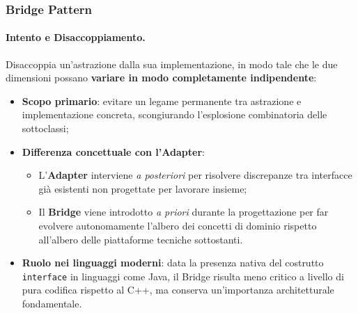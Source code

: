 \documentclass[12pt]{extarticle}
\begin{document}
\subsubsection{Bridge Pattern}

\paragraph{Intento e Disaccoppiamento.}
Disaccoppia un'astrazione dalla sua implementazione, in modo tale che le due dimensioni possano \textbf{variare in modo completamente indipendente}:
\begin{itemize}
    \item \textbf{Scopo primario}: evitare un legame permanente tra astrazione e implementazione concreta, scongiurando l'esplosione combinatoria delle sottoclassi;
    \item \textbf{Differenza concettuale con l'Adapter}:
    \begin{itemize}
        \item L'\textbf{Adapter} interviene \textit{a posteriori} per risolvere discrepanze tra interfacce già esistenti non progettate per lavorare insieme;
        \item Il \textbf{Bridge} viene introdotto \textit{a priori} durante la progettazione per far evolvere autonomamente l'albero dei concetti di dominio rispetto all'albero delle piattaforme tecniche sottostanti.
    \end{itemize}
    \item \textbf{Ruolo nei linguaggi moderni}: data la presenza nativa del costrutto \texttt{interface} in linguaggi come Java, il Bridge risulta meno critico a livello di pura codifica rispetto al C++, ma conserva un'importanza architetturale fondamentale.
\end{itemize}
\end{document}
